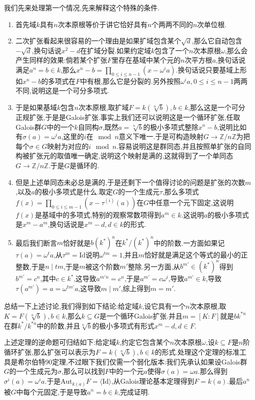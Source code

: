我们先来处理第一个情况,先来解释这个特殊的条件.
\begin{enumerate}
	\item 首先域$k$具有$n$次本原根等价于讲它恰好具有$n$个两两不同的$n$次单位根.
	\item 二次扩张看起来很容易的一个理由是如果扩域包含某个$\sqrt{d}$,那么它自动包含$-\sqrt{d}$,换句话说$x^2-d$在扩域分裂.如果约定域$k$包含了一个$n$次本原根$\omega$,那么会产生同样的效果:倘若某个扩张$F$里存在基域中某个元的$n$次平方根$a$,换句话说满足$a^n=b\in k$,那么$x^n-b=\prod_{0\le i\le n-1}(x-\omega^ia)$.换句话说只要基域上形如$x^n-b$的多项式在$F$中有根,那么它是分裂的.另外按照$\omega^ia,0\le i\le n-1$两两不同,说明这是一个可分多项式.
	\item 于是如果基域$k$包含$n$次本原根,取扩域$F=k(\sqrt[n]{b}),b\in k$,那么这是一个可分正规扩张,于是是Galois扩张.事实上我们还可以说明这是一个循环扩张,任取Galois群$G$中的一个$k$自同构$\sigma$,既然$a=\sqrt[n]{b}$的极小多项式整除$x^n-b$,说明比如有$\sigma(a)=\omega^ia$,这里的$i$在$\mod n$意义下唯一.于是可构造映射$G\to\mathbb{Z}/n\mathbb{Z}$为把每个$\sigma\in G$映射为对应的$i\mod n$.容易说明这是群同态,并且按照单扩张的自同构被扩张元的取值唯一确定,说明这个映射是满的,这就得到了一个单同态$G\to\mathbb{Z}/n\mathbb{Z}$.于是$G$是循环的.
	\item 但是上述单同态未必总是满的,于是还剩下一个值得讨论的问题是扩张的次数$m$,以及$a$的极小多项式是什么.取定$G$的一个生成元$\tau$,那么多项式$f(x)=\prod_{0\le i\le m-1}(x-\tau^{(i)}(a))$在$G$中任意一个元下固定,这说明$f(x)$是基域中的多项式,特别的观察常数项得到$a^m\in k$.这说明$a$的极小多项式是$x^m-a^m$,换句话说是$x^m-d,d\in k$的形式.
	\item 最后我们断言$m$恰好就是$b(k^*)^n$在$k^*/(k^*)^n$中的阶数.一方面如果记$\tau(a)=\omega^ta$,从$\tau^m=\mathrm{Id}$说明$\omega^{tm}=1$,并且$m$恰好就是满足这个等式的最小的正整数,于是$n\mid tm$,于是$m$被这个阶数$m'$整除.另一方面,从$b^{m'}\in (k^*)^n$得到$b^{m'}=c^n$,其中$c\in k^*$,这导致$a^{m'n}=c^n$,于是$a^{m'}=c\omega^i$,导致$a^{m'}\in k$,导致$\tau(a^{m'})=a=\omega^{tm'}a$,这导致$m\mid m'$,综上得到$m=m'$.
\end{enumerate}

总结一下上述讨论,我们得到如下结论:给定域$k$,设它具有一个$n$次本原根,取$K=F(\sqrt[n]{b}),b\in k$,那么$k\subseteq G$是一个循环Galois扩张.并且$m=[K:F]$就是$bk^ {*n}$在群$k^*/k^{*n}$中的阶数,并且$\sqrt[n]{b}$的极小多项式有形式$x^m-d,d\in F$.

上述定理的逆命题可归结如下:给定域$k$,约定它包含某个$n$次本原根$\omega$,设$k\subseteq F$是$n$阶循环扩张,那么扩张可以表示为$F=k(\sqrt[n]{b}),b\in k$的形式.处理这个定理的标准工具是希尔伯特90定理,不过眼下我们仅需一个弱化版本:我们先承认如果设Galois群$G$的一个生成元为$\sigma$,那么可以找到$F$中的一个元$a$使得$\sigma(a)=\omega a$.那么得到$\sigma^i(a)=\omega^ia$.于是$\mathrm{Aut}_{k(a)}F=\langle\mathrm{Id}\rangle$,从Galois理论基本定理得到$F=k(a)$.最后$a^n$被$G$中每个元固定,于是导致$a^n=b\in k$,完成证明.

